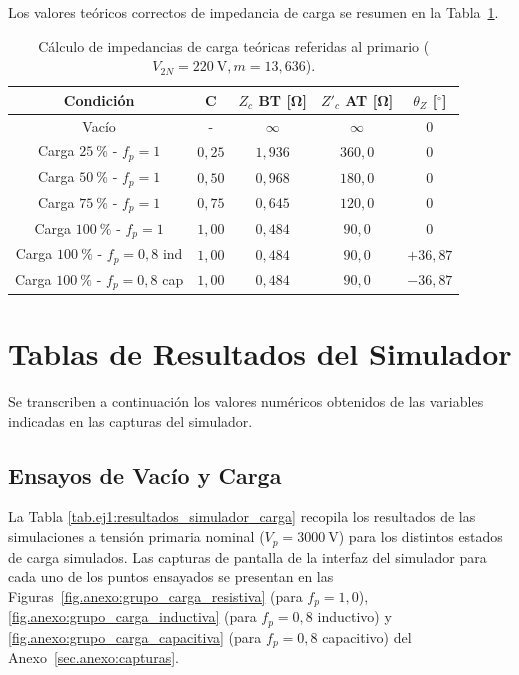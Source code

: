 Los valores teóricos correctos de impedancia de carga se resumen en la Tabla~\ref{tab.ej1:impedancias_teoricas}.

\begin{table}[!ht]
    \centering
    \begin{tabular}{|c|c|c|c|c|}
        \hline
        Condición & C & $Z_c$ BT [\si{\ohm}] & $Z'_c$ AT [\si{\ohm}] & $\theta_Z$ [$^\circ$] \\
        \hline
        Vacío & - & $\infty$ & $\infty$ & $0$ \\
        Carga $\SI{25}{\percent}$ - $f_p = 1$ & $0,25$ & $1,936$ & $360,0$ & $0$ \\
        Carga $\SI{50}{\percent}$ - $f_p = 1$ & $0,50$ & $0,968$ & $180,0$ & $0$ \\
        Carga $\SI{75}{\percent}$ - $f_p = 1$ & $0,75$ & $0,645$ & $120,0$ & $0$ \\
        Carga $\SI{100}{\percent}$ - $f_p = 1$ & $1,00$ & $0,484$ & $90,0$ & $0$ \\
        Carga $\SI{100}{\percent}$ - $f_p = 0,8$ ind & $1,00$ & $0,484$ & $90,0$ & $+36,87$ \\
        Carga $\SI{100}{\percent}$ - $f_p = 0,8$ cap & $1,00$ & $0,484$ & $90,0$ & $-36,87$ \\
        \hline
    \end{tabular}
    \caption{Cálculo de impedancias de carga teóricas referidas al primario ($V_{2N} = \SI{220}{\volt}, m = 13,636$).}
    \label{tab.ej1:impedancias_teoricas}
\end{table}

\section{Tablas de Resultados del Simulador}

Se transcriben a continuación los valores numéricos obtenidos de las variables indicadas en las capturas del simulador.

\subsection{Ensayos de Vacío y Carga}
La Tabla \ref{tab.ej1:resultados_simulador_carga} recopila los resultados de las simulaciones a tensión primaria nominal
($V_p = \SI{3000}{\volt}$) para los distintos estados de carga simulados. Las capturas de pantalla de la interfaz del simulador para cada uno de los puntos ensayados se presentan en las Figuras~\ref{fig.anexo:grupo_carga_resistiva} (para $f_p = 1,0$), \ref{fig.anexo:grupo_carga_inductiva} (para $f_p = 0,8$ inductivo) y \ref{fig.anexo:grupo_carga_capacitiva} (para $f_p = 0,8$ capacitivo) del Anexo~\ref{sec.anexo:capturas}.

